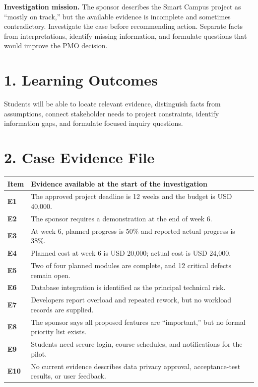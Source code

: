\documentclass[11pt,a4paper]{article}
\begin{document}

\begin{activitybox}
\textbf{Investigation mission.} The sponsor describes the Smart Campus project as ``mostly on track,'' but the available evidence is incomplete and sometimes contradictory. Investigate the case before recommending action. Separate facts from interpretations, identify missing information, and formulate questions that would improve the PMO decision.
\end{activitybox}

\section{1. Learning Outcomes}

Students will be able to locate relevant evidence, distinguish facts from assumptions, connect stakeholder needs to project constraints, identify information gaps, and formulate focused inquiry questions.

\section{2. Case Evidence File}

\begin{center}
\begin{tabularx}{\textwidth}{>{\bfseries}p{1.2cm} Y}
\toprule
Item & Evidence available at the start of the investigation \\
\midrule
E1 & The approved project deadline is 12 weeks and the budget is USD 40,000. \\
E2 & The sponsor requires a demonstration at the end of week 6. \\
E3 & At week 6, planned progress is 50\% and reported actual progress is 38\%. \\
E4 & Planned cost at week 6 is USD 20,000; actual cost is USD 24,000. \\
E5 & Two of four planned modules are complete, and 12 critical defects remain open. \\
E6 & Database integration is identified as the principal technical risk. \\
E7 & Developers report overload and repeated rework, but no workload records are supplied. \\
E8 & The sponsor says all proposed features are ``important,'' but no formal priority list exists. \\
E9 & Students need secure login, course schedules, and notifications for the pilot. \\
E10 & No current evidence describes data privacy approval, acceptance-test results, or user feedback. \\
\bottomrule
\end{tabularx}
\end{center}
\end{document}
